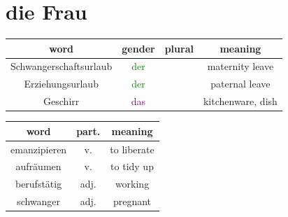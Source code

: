 \section{die Frau}

\begin{center}
    \begin{tabular}{|c|c|c|c|}
        \hline
        \rowcolor{gray}
        word                   & gender                  & plural & meaning           \\
        \hline
        Schwangerschaftsurlaub & \textcolor{green}{der}  &        & maternity leave   \\
        Erziehungsurlaub       & \textcolor{green}{der}  &        & paternal leave    \\
        \hline
        Geschirr               & \textcolor{purple}{das} &        & kitchenware, dish \\
        \hline
    \end{tabular}
\end{center}

\begin{center}
    \begin{tabular}{|c|c|c|}
        \hline
        \rowcolor{gray}
        word         & part. & meaning     \\
        \hline
        emanzipieren & v.    & to liberate \\
        aufräumen    & v.    & to tidy up  \\
        berufstätig  & adj.  & working     \\
        schwanger    & adj.  & pregnant    \\
        \hline
    \end{tabular}
\end{center}